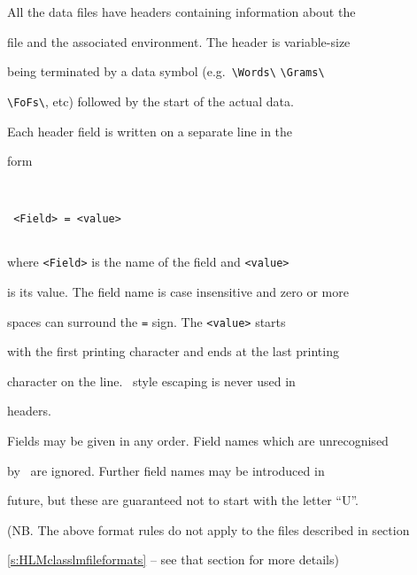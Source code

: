 




All the data files have headers containing information about the


file and the associated environment.  The header is variable-size


being terminated by a data symbol (e.g.\ \verb+\Words\+ \verb+\Grams\+


\verb+\FoFs\+, etc) followed by the start of the actual data.





Each header field is written on a separate line in the


form


\begin{verbatim}


 <Field> = <value>


\end{verbatim}


where \texttt{<Field>} is the name of the field and \texttt{<value>}


is its value.  The field name is case insensitive and zero or more


spaces can surround the \texttt{=} sign.  The \texttt{<value>} starts


with the first printing character and ends at the last printing


character on the line.  \HTK\ style escaping is never used in \HLM\


headers.





Fields may be given in any order.  Field names which are unrecognised


by \HTK\ are ignored.  Further field names may be introduced in


future, but these are guaranteed not to start with the letter ``U''.





(NB. The above format rules do not apply to the files described in section


\ref{s:HLMclasslmfileformats} -- see that section for more details)













